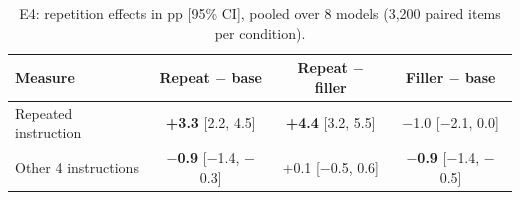 \begin{table}[t]
\centering
\caption{E4: repetition effects in pp [95\% CI], pooled over 8 models (3,200 paired items per condition).}
\label{tab:e4}
\begin{tabular}{@{}lccc@{}}
\toprule
\textbf{Measure} & \textbf{Repeat $-$ base} & \textbf{Repeat $-$ filler} & \textbf{Filler $-$ base} \\
\midrule
Repeated instruction & \textbf{+3.3} [2.2, 4.5] & \textbf{+4.4} [3.2, 5.5] & $-$1.0 [$-$2.1, 0.0] \\
Other 4 instructions & \textbf{$-$0.9} [$-$1.4, $-$0.3] & +0.1 [$-$0.5, 0.6] & \textbf{$-$0.9} [$-$1.4, $-$0.5] \\
\bottomrule
\end{tabular}
\end{table}
